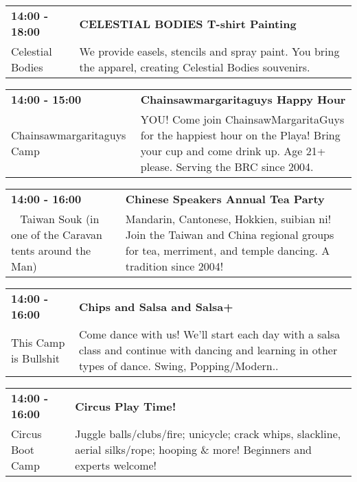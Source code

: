 \begin{tabular}{ p{1in} p{2.2in} }
    \textbf{14:00 - 18:00} & \textbf{CELESTIAL BODIES T-shirt Painting} \\
    Celestial Bodies \newline  & We provide easels, stencils and spray paint. You bring the apparel, creating Celestial Bodies souvenirs. \\
    \hline 
\end{tabular}
    
\begin{tabular}{ p{1in} p{2.2in} }
    \textbf{14:00 - 15:00} & \textbf{Chainsawmargaritaguys Happy Hour} \\
    Chainsawmargaritaguys Camp \newline  & YOU! Come join ChainsawMargaritaGuys for the happiest hour on the Playa! Bring your cup and come drink up. Age 21+ please. Serving the BRC since 2004. \\
    \hline 
\end{tabular}
    
\begin{tabular}{ p{1in} p{2.2in} }
    \textbf{14:00 - 16:00} & \textbf{Chinese Speakers Annual Tea Party} \\
    ~ \newline Taiwan Souk (in one of the Caravan tents around the Man) & Mandarin, Cantonese, Hokkien, suibian ni! Join the Taiwan and China regional groups for tea, merriment, and temple dancing. A tradition since 2004! \\
    \hline 
\end{tabular}
    
\begin{tabular}{ p{1in} p{2.2in} }
    \textbf{14:00 - 16:00} & \textbf{Chips and Salsa and Salsa+} \\
    This Camp is Bullshit \newline  & Come dance with us!  We'll start each day with a salsa class and continue with dancing and learning in other types of dance.  Swing, Popping/Modern.. \\
    \hline 
\end{tabular}
    
\begin{tabular}{ p{1in} p{2.2in} }
    \textbf{14:00 - 16:00} & \textbf{Circus Play Time!} \\
    Circus Boot Camp \newline  & Juggle balls/clubs/fire; unicycle; crack whips, slackline, aerial silks/rope; hooping \& more! Beginners and experts welcome! \\
    \hline 
\end{tabular}
    
